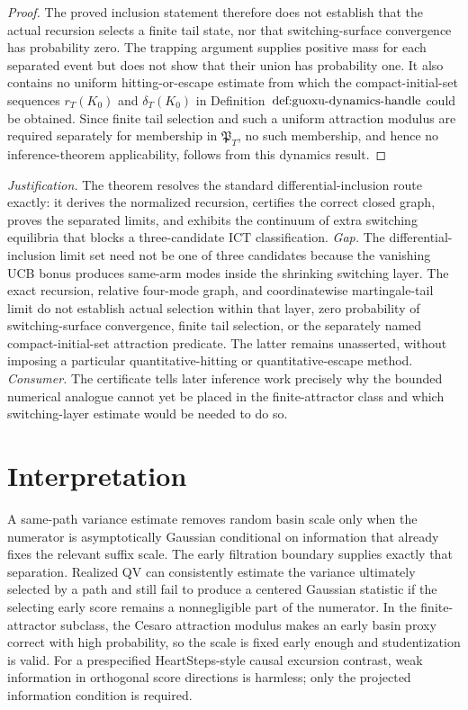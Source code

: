 \documentclass{article}
\begin{document}
\begin{proof}
The proved inclusion statement therefore does not establish that the actual recursion selects a finite tail state, nor that switching-surface convergence has probability zero.  The trapping argument supplies positive mass for each separated event but does not show that their union has probability one.  It also contains no uniform hitting-or-escape estimate from which the compact-initial-set sequences \(r_T(K_0)\) and \(\delta_T(K_0)\) in Definition~\(\textnormal{def:guoxu-dynamics-handle}\) could be obtained.  Since finite tail selection and such a uniform attraction modulus are required separately for membership in \(\mathfrak P_T\), no such membership, and hence no inference-theorem applicability, follows from this dynamics result.
\end{proof}
\par\smallskip\noindent \textit{Justification.} The theorem resolves the standard differential-inclusion route exactly: it derives the normalized recursion, certifies the correct closed graph, proves the separated limits, and exhibits the continuum of extra switching equilibria that blocks a three-candidate ICT classification. \textit{Gap.} The differential-inclusion limit set need not be one of three candidates because the vanishing UCB bonus produces same-arm modes inside the shrinking switching layer. The exact recursion, relative four-mode graph, and coordinatewise martingale-tail limit do not establish actual selection within that layer, zero probability of switching-surface convergence, finite tail selection, or the separately named compact-initial-set attraction predicate. The latter remains unasserted, without imposing a particular quantitative-hitting or quantitative-escape method. \textit{Consumer.} The certificate tells later inference work precisely why the bounded numerical analogue cannot yet be placed in the finite-attractor class and which switching-layer estimate would be needed to do so.

\section{Interpretation}

A same-path variance estimate removes random basin scale only when the numerator is asymptotically Gaussian conditional on information that already fixes the relevant suffix scale. The early filtration boundary supplies exactly that separation. Realized QV can consistently estimate the variance ultimately selected by a path and still fail to produce a centered Gaussian statistic if the selecting early score remains a nonnegligible part of the numerator. In the finite-attractor subclass, the Cesaro attraction modulus makes an early basin proxy correct with high probability, so the scale is fixed early enough and studentization is valid. For a prespecified HeartSteps-style causal excursion contrast, weak information in orthogonal score directions is harmless; only the projected information condition is required.
\end{document}
